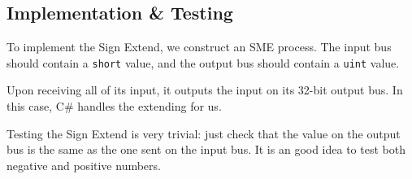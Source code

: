 \documentclass{beamer}
\begin{document}
\subsection{Implementation \& Testing}
\begin{frame}
    To implement the Sign Extend, we construct an SME process. The input bus
    should contain a \texttt{short} value, and the output bus should contain a
    \texttt{uint} value.

    \vspace{\baselineskip}
    Upon receiving all of its input, it outputs the input on its 32-bit output
    bus. In this case, C\# handles the extending for us.

    \vspace{\baselineskip}
    Testing the Sign Extend is very trivial: just check that the value on the
    output bus is the same as the one sent on the input bus. It is an good idea
    to test both negative and positive numbers.
\end{frame}
\end{document}
